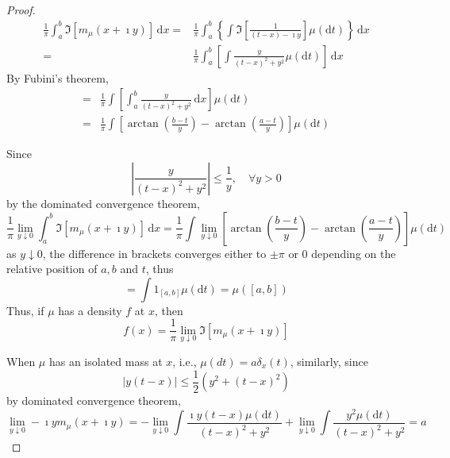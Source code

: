 \begin{proof}
    \begin{equation*}
        \begin{aligned}
            \frac{1}{\pi}\int_{a}^{b}\Im\left[m_{\mu}(x+\imath y)\right]\,\mathrm{d}x= & \frac{1}{\pi}\int_{a}^{b}\left\{\int\Im\left[\frac{1}{(t-x)-\imath y}\right]\mu(\mathrm{d}t)\right\}\,\mathrm{d}x \\
            =                                                                          & \frac{1}{\pi}\int_{a}^{b}\left[\int\frac{y}{(t-x)^{2}+y^{2}}\mu(\mathrm{d}t)\right]\,\mathrm{d}x
        \end{aligned}
    \end{equation*}
    By Fubini's theorem,
    \begin{equation*}
        \begin{aligned}
            = & \frac{1}{\pi}\int\left[\int_{a}^{b}\frac{y}{(t-x)^{2}+y^{2}}\,\mathrm{d}x\right]\mu(\mathrm{d}t)                  \\
            = & \frac{1}{\pi}\int\left[\arctan\left(\frac{b-t}{y}\right)-\arctan\left(\frac{a-t}{y}\right)\right]\mu(\mathrm{d}t)
        \end{aligned}
    \end{equation*}

    Since
    \begin{equation*}
        \left|\frac{y}{(t-x)^{2}+y^{2}}\right|\leq\frac{1}{y},\quad\forall y>0
    \end{equation*}
    by the dominated convergence theorem,
    \begin{equation*}
        \frac{1}{\pi}\lim_{y\downarrow 0}\int_{a}^{b}\Im\left[m_{\mu}(x+\imath y)\right]\,\mathrm{d}x=\frac{1}{\pi}\int\lim_{y\downarrow 0}\left[\arctan\left(\frac{b-t}{y}\right)-\arctan\left(\frac{a-t}{y}\right)\right]\mu(\mathrm{d}t)
    \end{equation*}
    as $y\downarrow 0$, the difference in brackets converges either to $\pm \pi$ or 0 depending on the relative position of $a,b$ and $t$, thus
    \begin{equation*}
        =\int\mathrm{1}_{[a,b]}\mu(\mathrm{d}t)=\mu\left([a,b]\right)
    \end{equation*}
    Thus, if $\mu$ has a density $f$ at $x$, then
    \begin{equation*}
        f(x)=\frac{1}{\pi}\lim_{y\downarrow 0}\Im\left[m_{\mu}(x+\imath y)\right]
    \end{equation*}

    When $\mu$ has an isolated mass at $x$, i.e., $\mu(d t)=a \delta_{x}(t)$, similarly, since
    \begin{equation*}
        |y(t-x)|\leq\frac{1}{2}\left(y^{2}+(t-x)^{2}\right)
    \end{equation*}
    by dominated convergence theorem,
    \begin{equation*}
        \lim_{y\downarrow 0}-\imath ym_{\mu}(x+\imath y)=-\lim_{y\downarrow 0}\int\frac{\imath y(t-x)\mu(\mathrm{d}t)}{(t-x)^{2}+y^{2}}+\lim_{y\downarrow 0}\int\frac{y^{2}\mu(\mathrm{d}t)}{(t-x)^{2}+y^{2}}=a
    \end{equation*}
\end{proof}

